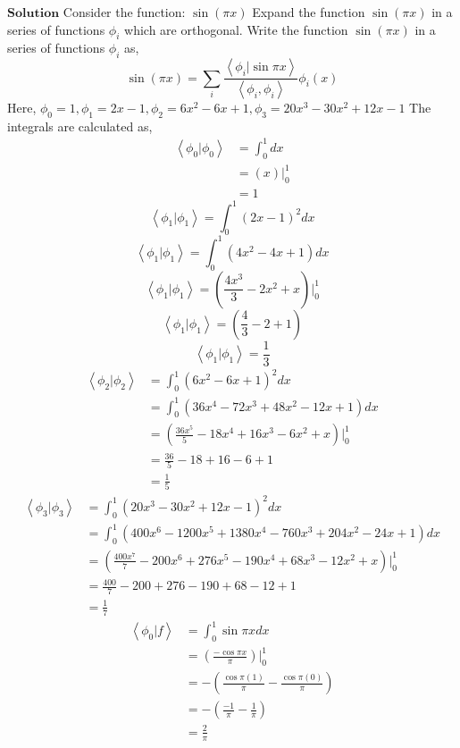 $\boxed{\textbf{Solution}}$ Consider the function:
$\sin (\pi x)$
Expand the function $\sin (\pi x)$ in a series of functions $\phi_{i}$ which are orthogonal. Write the function $\sin (\pi x)$ in a series of functions $\phi_{i}$ as,
$$
\sin (\pi x)=\sum_{i} \frac{\left\langle\phi_{i} | \sin \pi x\right\rangle}{\left\langle\phi_{i}, \phi_{i}\right\rangle} \phi_{i}(x)
$$
Here, $\phi_{0}=1, \phi_{1}=2 x-1, \phi_{2}=6 x^{2}-6 x+1, \phi_{3}=20 x^{3}-30 x^{2}+12 x-1$
The integrals are calculated as,
$$
\begin{aligned}
\left\langle\phi_{0} | \phi_{0}\right\rangle &=\int_{0}^{1} d x \\
&=(x)\Big|_{0}^{1} \\
&=1
\end{aligned}
$$
$$
\left\langle\phi_{1} | \phi_{1}\right\rangle=\int_{0}^{1}(2 x-1)^{2} d x
$$
$$\left\langle\phi_{1} | \phi_{1}\right\rangle=\int_{0}^{1}\left(4 x^{2}-4 x+1\right) d x$$
$$\left\langle\phi_{1} | \phi_{1}\right\rangle=\left(\frac{4 x^{3}}{3}-2 x^{2}+x\right)\Bigg|_{0}^{1}$$
$$\left\langle\phi_{1} | \phi_{1}\right\rangle=\left(\frac{4}{3}-2+1\right)$$
$$\left\langle\phi_{1} | \phi_{1}\right\rangle=\frac{1}{3}$$
$$
\begin{aligned}
\left\langle\phi_{2} | \phi_{2}\right\rangle &=\int_{0}^{1}\left(6 x^{2}-6 x+1\right)^{2} d x \\
&=\int_{0}^{1}\left(36 x^{4}-72 x^{3}+48 x^{2}-12 x+1\right) d x \\
&=\left(\frac{36 x^{5}}{5}-18 x^{4}+16 x^{3}-6 x^{2}+x\right)\Bigg|_{0}^{1} \\
&=\frac{36}{5}-18+16-6+1 \\
&=\frac{1}{5}
\end{aligned}
$$
$$
\begin{aligned}
\left\langle\phi_{3} | \phi_{3}\right\rangle &=\int_{0}^{1}\left(20 x^{3}-30 x^{2}+12 x-1\right)^{2} d x \\
&=\int_{0}^{1}\left(400 x^{6}-1200 x^{5}+1380 x^{4}-760 x^{3}+204 x^{2}-24 x+1\right) d x \\
&=\left(\frac{400 x^{7}}{7}-200 x^{6}+276 x^{5}-190 x^{4}+68 x^{3}-12 x^{2}+x\right)\Bigg|_{0}^{1} \\
&=\frac{400}{7}-200+276-190+68-12+1 \\
&=\frac{1}{7}
\end{aligned}
$$
$$
\begin{aligned}
\left\langle\phi_{0} | f\right\rangle &=\int_{0}^{1} \sin \pi x d x \\
&=\left(\frac{-\cos \pi x}{\pi}\right)\Bigg|_{0}^{1} \\
&=-\left(\frac{\cos \pi(1)}{\pi}-\frac{\cos \pi(0)}{\pi}\right) \\
&=-\left(\frac{-1}{\pi}-\frac{1}{\pi}\right) \\
&=\frac{2}{\pi}
\end{aligned}
$$
